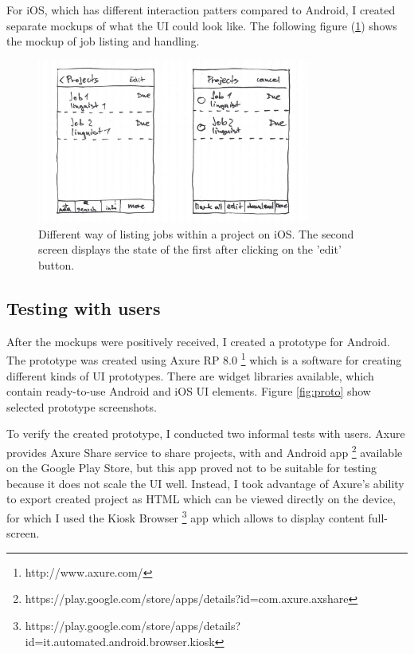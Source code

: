 For iOS, which has different interaction patters compared to Android, I created separate mockups of what the UI could look like. The following figure (\ref{mock5}) shows the mockup of job listing and handling.



\begin{figure}[H]
	\includegraphics[width=0.8\textwidth]{pics/iosProjs2}
	\caption{Different way of listing jobs within a project on iOS. The second screen displays the state of the first after clicking on the 'edit' button.}
	\label{mock5}
\end{figure}

\subsection{Testing with users}

After the mockups were positively received, I created a prototype for Android. The prototype was created using Axure RP 8.0 \footnote{http://www.axure.com/} which is a software for creating different kinds of UI prototypes. There are widget libraries available, which contain ready-to-use Android and iOS UI elements. Figure \ref{fig:proto} show selected prototype screenshots.

To verify the created prototype, I conducted two informal tests with users. Axure provides Axure Share service to share projects, with and Android app \footnote{https://play.google.com/store/apps/details?id=com.axure.axshare} available on the Google Play Store, but this app proved not to be suitable for testing because it does not scale the UI well. Instead, I took advantage of Axure's ability to export created project as HTML which can be viewed directly on the device, for which I used the Kiosk Browser \footnote{https://play.google.com/store/apps/details?id=it.automated.android.browser.kiosk} app which allows to display content full-screen. 


